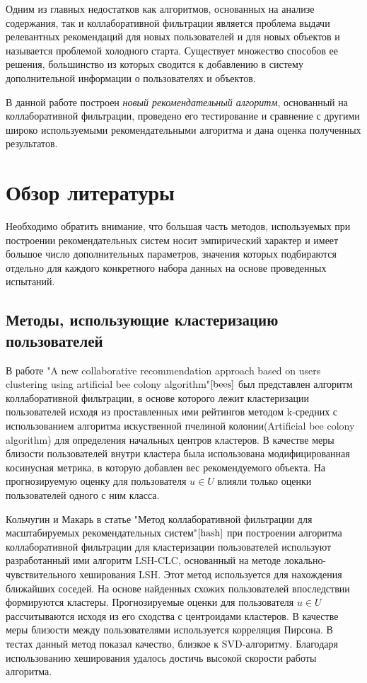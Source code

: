 \documentclass[12pt]{article} %
\begin{document}
\par 
Одним из главных недостатков как алгоритмов, основанных на анализе содержания, так и коллаборативной фильтрации является проблема выдачи релевантных рекомендаций для новых пользователей и для новых объектов и называется проблемой холодного старта. Существует множество способов ее решения, большинство из которых сводится к добавлению в систему дополнительной информации о пользователях и объектов.

В данной работе построен \textit{новый рекомендательный алгоритм}, основанный на коллаборативной фильтрации, проведено его тестирование и сравнение с другими широко используемыми рекомендательными алгоритма и дана оценка полученных результатов.


\section{Обзор литературы}
\par 
Необходимо обратить внимание, что большая часть методов, используемых при построении рекомендательных систем носит эмпирический характер и имеет большое число дополнительных параметров, значения которых подбираются отдельно для каждого конкретного набора данных на основе проведенных испытаний.
\subsection{Методы, использующие кластеризацию пользователей}
\par
В работе "A new collaborative recommendation approach based on users clustering using artificial bee colony algorithm"$\cite{bees}$ был представлен алгоритм коллаборативной фильтрации, в основе которого лежит кластеризации пользователей исходя из проставленных ими рейтингов методом k-средних с использованием алгоритма искуственной пчелиной колонии(Artificial bee colony algorithm) для определения начальных центров кластеров. В качестве меры близости пользователей внутри кластера была использована модифицированная косинусная метрика, в которую добавлен вес рекомендуемого объекта. На прогнозируемую оценку для пользователя $u \in U$  влияли только оценки пользователей одного с ним класса. 
\par 
Кольчугин и Макарь в статье "Метод коллаборативной фильтрации для масштабируемых рекомендательных систем"$\cite{hash}$ при построении алгоритма коллаборативной фильтрации для кластеризации пользователей используют разработанный ими алгоритм LSH-CLC, основанный на методе локально-чувствительного хеширования LSH. Этот метод используется для нахождения ближайших соседей. На основе найденных схожих пользователей впоследствии формируются кластеры. Прогнозируемые оценки для пользователя $u \in U$ рассчитываются исходя из его сходства с центроидами кластеров. В качестве меры близости между пользователями используется корреляция Пирсона.  В тестах данный метод показал качество, близкое к SVD-алгоритму. Благодаря использованию хеширования удалось достичь высокой скорости работы алгоритма.   
\end{document}
